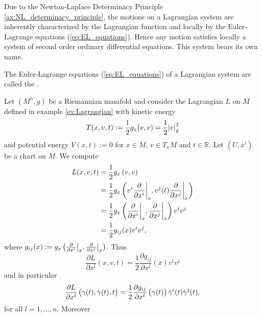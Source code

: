 Due to the Newton-Laplace Determinacy Principle \ref{ax:NL_determinacy_principle}, the motions on a Lagrangian system are inherently characterized by the Lagrangian function and locally by the Euler-Lagrange equations (\ref{eq:EL_equations}). Hence any motion satisfies locally a system of second order ordinary differential equations. This system bears its own name.

\begin{definition}
	The Euler-Lagrange equations \textup{(}\ref{eq:EL_equations}\textup{)} of a Lagrangian system are called the .
\end{definition}

\begin{example}
	\label{ex:motions_on_Riemannian_manifolds}
	Let $(M^n,g)$ be a Riemannian manifold and consider the Lagrangian $L$ on $M$ defined in example \ref{ex:Lagrangian} with kinetic energy
	\begin{equation*}
		T(x,v,t) := \frac{1}{2}g_x(v,v) = \frac{1}{2}\abs{v}^2_g
	\end{equation*}
	\noindent and potential energy $V(x,t) := 0$ for $x \in M$, $v \in T_xM$ and $t \in \mathbb{R}$. Let $(U,x^i)$ be a chart on $M$. We compute
	\begin{align*}
		L(x,v,t) &= \frac{1}{2}g_{x}\del[0]{v,v}\\
		&= \frac{1}{2}g_{x}\del[3]{v^i\frac{\partial}{\partial x^i}\bigg\vert_x,v^j(t)\frac{\partial}{\partial x^j}\bigg\vert_x}\\
		&= \frac{1}{2}g_{x}\del[3]{\frac{\partial}{\partial x^i}\bigg\vert_x,\frac{\partial}{\partial x^j}\bigg\vert_x}v^iv^j\\
		&= \frac{1}{2}g_{ij}(x)v^iv^j,
	\end{align*}
	\noindent where $g_{ij}(x) := g_{x}\del[1]{\frac{\partial}{\partial x^i}\big\vert_x,\frac{\partial}{\partial x^j}\big\vert_x}$. Thus 
	\begin{equation*}
		\frac{\partial L}{\partial x^l}(x,v,t) = \frac{1}{2}\frac{\partial g_{ij}}{\partial x^l}(x)v^i v^j
	\end{equation*}
	\noindent and in particular
	\begin{equation*}
		\frac{\partial L}{\partial x^l}\del[1]{\gamma(t),\dot{\gamma}(t),t} = \frac{1}{2}\frac{\partial g_{ij}}{\partial x^l}\del[1]{\gamma(t)}\dot{\gamma}^i(t) \dot{\gamma}^j(t),
	\end{equation*}
	\noindent for all $l = 1,\dots,n$. Moreover

\end{example}
